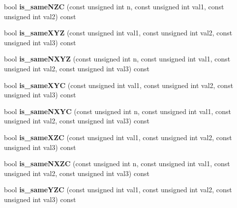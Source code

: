 \begin{DoxyCompactItemize}
\item 
\hypertarget{structcimg__library_1_1CImgList_ad9e8be920d77cd03138ac0cd130a65f1}{
bool {\bfseries is\_\-sameNZC} (const unsigned int n, const unsigned int val1, const unsigned int val2) const }
\label{structcimg__library_1_1CImgList_ad9e8be920d77cd03138ac0cd130a65f1}

\item 
\hypertarget{structcimg__library_1_1CImgList_ab9bbd81e12e736cdc6fda8dec7ca22ef}{
bool {\bfseries is\_\-sameXYZ} (const unsigned int val1, const unsigned int val2, const unsigned int val3) const }
\label{structcimg__library_1_1CImgList_ab9bbd81e12e736cdc6fda8dec7ca22ef}

\item 
\hypertarget{structcimg__library_1_1CImgList_a4c602ac46a87f1ccf819c51faf643098}{
bool {\bfseries is\_\-sameNXYZ} (const unsigned int n, const unsigned int val1, const unsigned int val2, const unsigned int val3) const }
\label{structcimg__library_1_1CImgList_a4c602ac46a87f1ccf819c51faf643098}

\item 
\hypertarget{structcimg__library_1_1CImgList_a872e281613b4582319afb93313deb289}{
bool {\bfseries is\_\-sameXYC} (const unsigned int val1, const unsigned int val2, const unsigned int val3) const }
\label{structcimg__library_1_1CImgList_a872e281613b4582319afb93313deb289}

\item 
\hypertarget{structcimg__library_1_1CImgList_ac7bc287fe1f663a6cdfe702eaae2c9a6}{
bool {\bfseries is\_\-sameNXYC} (const unsigned int n, const unsigned int val1, const unsigned int val2, const unsigned int val3) const }
\label{structcimg__library_1_1CImgList_ac7bc287fe1f663a6cdfe702eaae2c9a6}

\item 
\hypertarget{structcimg__library_1_1CImgList_a8f2315af629eeda36b7b573be1b085d6}{
bool {\bfseries is\_\-sameXZC} (const unsigned int val1, const unsigned int val2, const unsigned int val3) const }
\label{structcimg__library_1_1CImgList_a8f2315af629eeda36b7b573be1b085d6}

\item 
\hypertarget{structcimg__library_1_1CImgList_a7922bf31582c7acc820c9281f582cc3e}{
bool {\bfseries is\_\-sameNXZC} (const unsigned int n, const unsigned int val1, const unsigned int val2, const unsigned int val3) const }
\label{structcimg__library_1_1CImgList_a7922bf31582c7acc820c9281f582cc3e}

\item 
\hypertarget{structcimg__library_1_1CImgList_a0f7d42458d6ff7923bcda712d343dbb7}{
bool {\bfseries is\_\-sameYZC} (const unsigned int val1, const unsigned int val2, const unsigned int val3) const }
\label{structcimg__library_1_1CImgList_a0f7d42458d6ff7923bcda712d343dbb7}


\end{DoxyCompactItemize}
